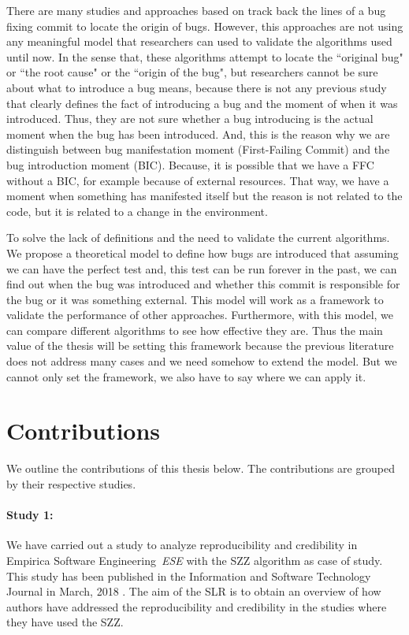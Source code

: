 \documentclass[a4paper, 12pt]{book}
\begin{document}
There are many studies and approaches based on track back the lines of a bug fixing commit to locate the origin of bugs. However, this approaches are not using any meaningful model that researchers can used to validate the algorithms used until now. In the sense that, these algorithms attempt to locate the ``original bug" or ``the root cause" or the ``origin of the bug", but researchers cannot be sure about what to introduce a bug means, because there is not any previous study that clearly defines the fact of introducing a bug and the moment of when it was introduced. Thus, they are not sure whether a bug introducing is the actual moment when the bug has been introduced. And, this is the reason why we are distinguish between bug manifestation moment (First-Failing Commit) and the bug introduction moment (BIC). Because, it is possible that we have a FFC without a BIC, for example because of external resources. That way, we have a moment when something has manifested itself but the reason is not related to the code, but it is related to a change in the environment.

To solve the lack of definitions and the need to validate the current algorithms. We propose a theoretical model to define how bugs are introduced that assuming we can have the perfect test and, this test can be run forever in the past, we can find out when the bug was introduced and whether this commit is responsible for the bug or it was something external. This model will work as a framework to validate the performance of other approaches. Furthermore, with this model, we can compare different algorithms to see how effective they are. Thus the main value of the thesis will be setting this framework because the previous literature does not address many cases and we need somehow to extend the model. But we cannot only set the framework, we also have to say where we can apply it.


\section{Contributions}
\label{subsec:contributions}
We outline the contributions of this thesis below. The contributions are grouped by their respective studies.

\paragraph{Study 1:}
We have carried out a study to analyze reproducibility and credibility in Empirica Software Engineering~\emph{ESE} with the SZZ algorithm as case of study. This study has been published in the Information and Software Technology Journal in March, 2018 \cite{rodriguez2018reproducibility}. The aim of the SLR is to obtain an overview of how authors have addressed the reproducibility and credibility in the studies where they have used the SZZ.
\end{document}
